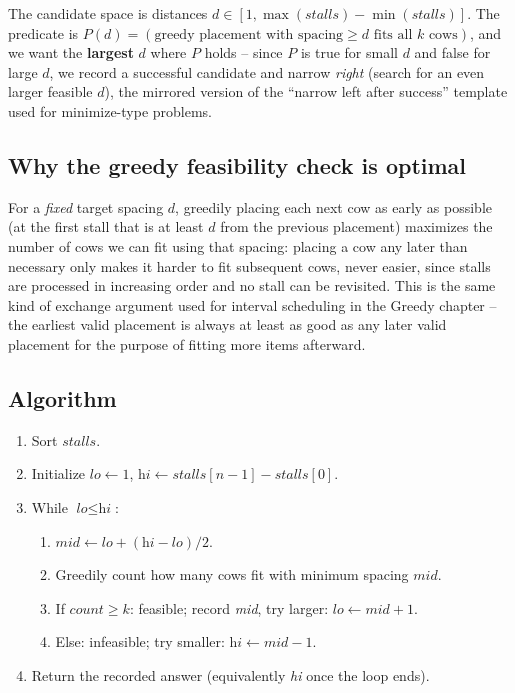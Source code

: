 \begin{ideabox}
The candidate space is distances $d \in [1, \max(\textit{stalls}) -
\min(\textit{stalls})]$. The predicate is
$P(d) = (\text{greedy placement with spacing} \ge d \text{ fits all } k
\text{ cows})$, and we want the \textbf{largest} $d$ where $P$ holds --
since $P$ is true for small $d$ and false for large $d$, we record a
successful candidate and narrow \emph{right} (search for an even larger
feasible $d$), the mirrored version of the ``narrow left after success''
template used for minimize-type problems.
\end{ideabox}

\subsection*{Why the greedy feasibility check is optimal}

For a \emph{fixed} target spacing $d$, greedily placing each next cow as
early as possible (at the first stall that is at least $d$ from the
previous placement) maximizes the number of cows we can fit using that
spacing: placing a cow any later than necessary only makes it harder to
fit subsequent cows, never easier, since stalls are processed in
increasing order and no stall can be revisited. This is the same kind of
exchange argument used for interval scheduling in the Greedy chapter --
the earliest valid placement is always at least as good as any later
valid placement for the purpose of fitting more items afterward.

\subsection*{Algorithm}

\begin{enumerate}
  \item Sort $\textit{stalls}$.
  \item Initialize $\textit{lo} \gets 1$,
        $\textit{hi} \gets \textit{stalls}[n-1] - \textit{stalls}[0]$.
  \item While $\textit{lo} \le \textit{hi}$:
  \begin{enumerate}
    \item $\textit{mid} \gets \textit{lo}+(\textit{hi}-\textit{lo})/2$.
    \item Greedily count how many cows fit with minimum spacing
          $\textit{mid}$.
    \item If $\textit{count} \ge k$: feasible; record \textit{mid}, try
          larger: $\textit{lo} \gets \textit{mid}+1$.
    \item Else: infeasible; try smaller: $\textit{hi} \gets \textit{mid}-1$.
  \end{enumerate}
  \item Return the recorded answer (equivalently \textit{hi} once the loop
        ends).
\end{enumerate}

